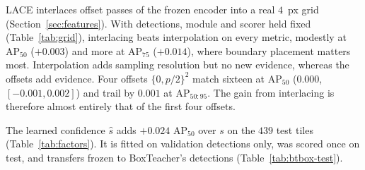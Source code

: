 \documentclass[remotesensing,article,submit,moreauthors]{Definitions/mdpi}
\begin{document}
LACE interlaces offset passes of the frozen encoder into a real $4$~px grid (Section~\ref{sec:features}). With detections, module and scorer held fixed (Table~\ref{tab:grid}), interlacing beats interpolation on every metric, modestly at AP$_{50}$ ($+0.003$) and more at AP$_{75}$ ($+0.014$), where boundary placement matters most. Interpolation adds sampling resolution but no new evidence, whereas the offsets add evidence. Four offsets $\{0, p/2\}^2$ match sixteen at AP$_{50}$ ($0.000$, $[-0.001, 0.002]$) and trail by $0.001$ at AP$_{50:95}$. The gain from interlacing is therefore almost entirely that of the first four offsets.

The learned confidence $\hat s$ adds $+0.024$ AP$_{50}$ over $s$ on the $439$ test tiles (Table~\ref{tab:factors}). It is fitted on validation detections only, was scored once on test, and transfers frozen to BoxTeacher's detections (Table~\ref{tab:btbox-test}).
\end{document}
